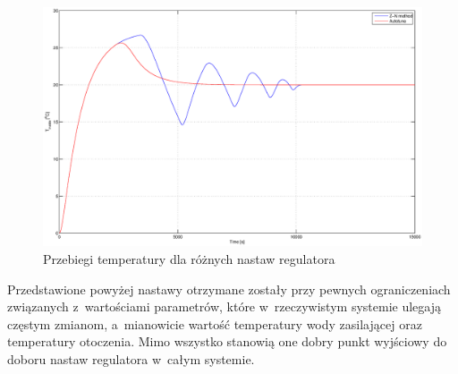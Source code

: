 \documentclass[12pt, a4paper]{article}
\begin{document}
    \newpage
    
    \begin{figure}[!ht]
    	\centering
    	\includegraphics[width=\textwidth]{../img/temp.eps}
    	\caption{Przebiegi temperatury dla różnych nastaw regulatora}
    	\label{rys:temp}
    \end{figure}
    
    Przedstawione powyżej nastawy otrzymane zostały przy pewnych ograniczeniach
    związanych z~wartościami parametrów, które w~rzeczywistym systemie ulegają
    częstym zmianom, a~mianowicie wartość temperatury wody zasilającej oraz
    temperatury otoczenia. Mimo wszystko stanowią one dobry punkt wyjściowy do
    doboru nastaw regulatora w~całym systemie.
    
\end{document}
